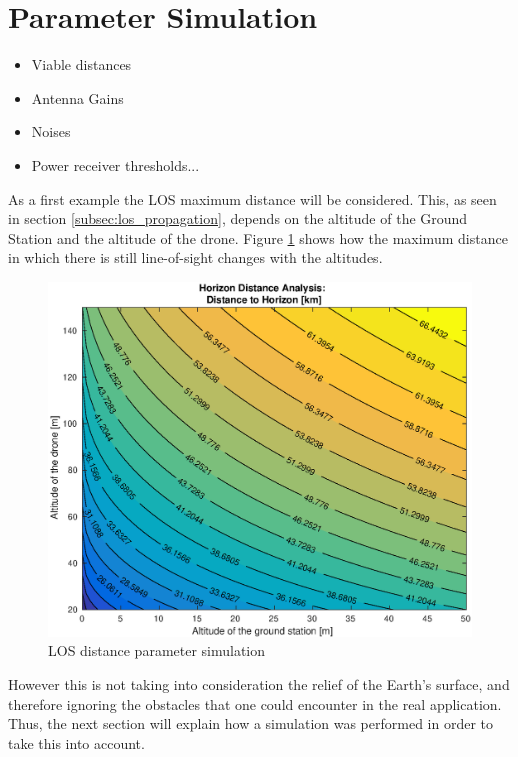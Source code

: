 \section{Parameter Simulation}

\begin{itemize}
\item{Viable distances}
\item{Antenna Gains}
\item{Noises}
\item{Power receiver thresholds...}
\end{itemize}

As a first example the LOS maximum distance will be considered. This, as seen in section \ref{subsec:los_propagation}, depends on the altitude of the Ground Station and the altitude of the drone. Figure \ref{fig:altitude2distance} shows how the maximum distance in which there is still line-of-sight changes with the altitudes.

\begin{figure}[H]
	\centering
	\includegraphics[scale=0.70]{figures/altitude2distance.eps}
	\caption{LOS distance parameter simulation}
   	\label{fig:altitude2distance}
\end{figure}

However this is not taking into consideration the relief of the Earth's surface, and therefore ignoring the obstacles that one could encounter in the real application. Thus, the next section will explain how a simulation was performed in order to take this into account.
